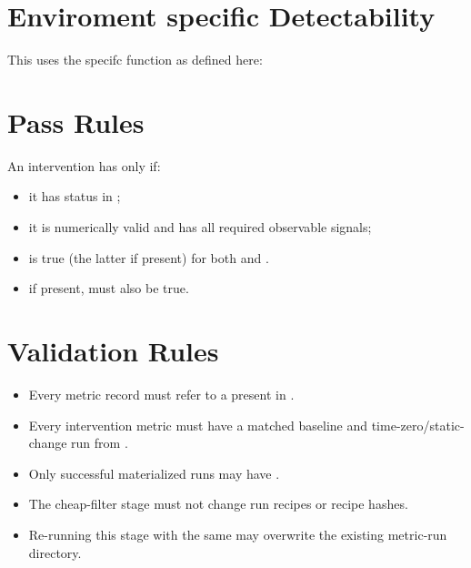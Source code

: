 \documentclass[11pt]{article}
\begin{document}
\section*{Enviroment specific Detectability}
This uses the \termEnv specifc function  as defined here:

\section*{Pass Rules}

An intervention has  only if:

\begin{itemize}
\item it has status  in ;
\item it is numerically valid and has all required observable signals;
\item {} is true (the latter if present)  for both  and .
\item if present,  must also be true.
\end{itemize}


\section*{Validation Rules}

\begin{itemize}
\item Every metric record must refer to a  present in .
\item Every intervention metric must have a matched baseline and time-zero/static-change run from .
\item Only successful materialized runs may have .
\item The cheap-filter stage must not change run recipes or recipe hashes.
\item Re-running this stage with the same  may overwrite the existing metric-run directory.
\end{itemize}
\end{document}
